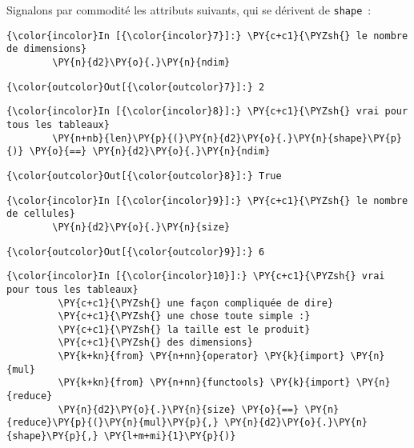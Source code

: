    Signalons par commodité les attributs suivants, qui se dérivent de
\texttt{shape}~:

    \begin{Verbatim}[commandchars=\\\{\},frame=single,framerule=0.3mm,rulecolor=\color{cellframecolor}]
{\color{incolor}In [{\color{incolor}7}]:} \PY{c+c1}{\PYZsh{} le nombre de dimensions}
        \PY{n}{d2}\PY{o}{.}\PY{n}{ndim}
\end{Verbatim}


\begin{Verbatim}[commandchars=\\\{\},frame=single,framerule=0.3mm,rulecolor=\color{cellframecolor}]
{\color{outcolor}Out[{\color{outcolor}7}]:} 2
\end{Verbatim}
            
    \begin{Verbatim}[commandchars=\\\{\},frame=single,framerule=0.3mm,rulecolor=\color{cellframecolor}]
{\color{incolor}In [{\color{incolor}8}]:} \PY{c+c1}{\PYZsh{} vrai pour tous les tableaux}
        \PY{n+nb}{len}\PY{p}{(}\PY{n}{d2}\PY{o}{.}\PY{n}{shape}\PY{p}{)} \PY{o}{==} \PY{n}{d2}\PY{o}{.}\PY{n}{ndim}
\end{Verbatim}


\begin{Verbatim}[commandchars=\\\{\},frame=single,framerule=0.3mm,rulecolor=\color{cellframecolor}]
{\color{outcolor}Out[{\color{outcolor}8}]:} True
\end{Verbatim}
            
    \begin{Verbatim}[commandchars=\\\{\},frame=single,framerule=0.3mm,rulecolor=\color{cellframecolor}]
{\color{incolor}In [{\color{incolor}9}]:} \PY{c+c1}{\PYZsh{} le nombre de cellules}
        \PY{n}{d2}\PY{o}{.}\PY{n}{size}
\end{Verbatim}


\begin{Verbatim}[commandchars=\\\{\},frame=single,framerule=0.3mm,rulecolor=\color{cellframecolor}]
{\color{outcolor}Out[{\color{outcolor}9}]:} 6
\end{Verbatim}
            
    \begin{Verbatim}[commandchars=\\\{\},frame=single,framerule=0.3mm,rulecolor=\color{cellframecolor}]
{\color{incolor}In [{\color{incolor}10}]:} \PY{c+c1}{\PYZsh{} vrai pour tous les tableaux}
         \PY{c+c1}{\PYZsh{} une façon compliquée de dire}
         \PY{c+c1}{\PYZsh{} une chose toute simple :}
         \PY{c+c1}{\PYZsh{} la taille est le produit}
         \PY{c+c1}{\PYZsh{} des dimensions}
         \PY{k+kn}{from} \PY{n+nn}{operator} \PY{k}{import} \PY{n}{mul}
         \PY{k+kn}{from} \PY{n+nn}{functools} \PY{k}{import} \PY{n}{reduce}
         \PY{n}{d2}\PY{o}{.}\PY{n}{size} \PY{o}{==} \PY{n}{reduce}\PY{p}{(}\PY{n}{mul}\PY{p}{,} \PY{n}{d2}\PY{o}{.}\PY{n}{shape}\PY{p}{,} \PY{l+m+mi}{1}\PY{p}{)}
\end{Verbatim}


